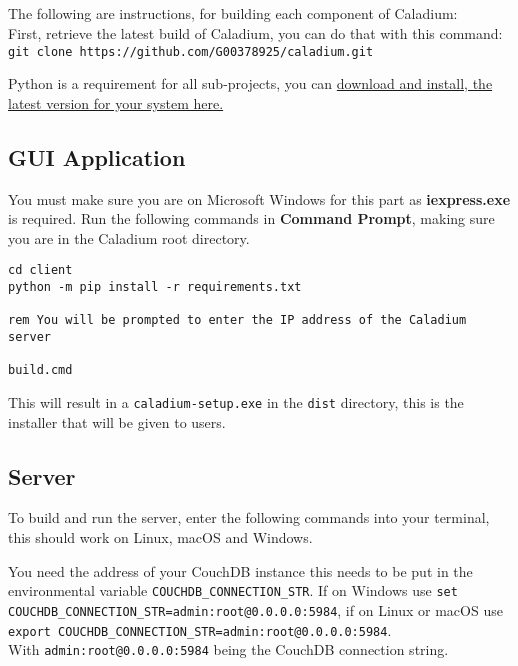 \begin{appendices}
\renewcommand{\chaptername}{Appendix C}
\renewcommand{\thechapter}{C}
\chapter{}
\label{appendix:c}

The following are instructions,
for building each component of Caladium: \\
First, retrieve the latest build of Caladium, you can do that with this command:
\texttt{git clone https://github.com/G00378925/caladium.git}

Python is a requirement for all sub-projects, you can
\href{https://www.python.org/downloads/}{download and install, the latest version for your system here.}

\section{GUI Application}
You must make sure you are on Microsoft Windows
for this part as \textbf{iexpress.exe} is required.
Run the following commands in \textbf{Command Prompt},
making sure you are in the Caladium root directory.

\begin{lstlisting}
cd client
python -m pip install -r requirements.txt

rem You will be prompted to enter the IP address of the Caladium server

build.cmd
\end{lstlisting}

This will result in a \texttt{caladium-setup.exe} in the \texttt{dist} directory,
this is the installer that will be given to users.
\section{Server}
To build and run the server, enter the following commands into your terminal,
this should work on Linux, macOS and Windows.

You need the address of your CouchDB instance this needs
to be put in the environmental variable \texttt{COUCHDB\_CONNECTION\_STR}.
If on Windows use
\texttt{set COUCHDB\_CONNECTION\_STR=admin:root@0.0.0.0:5984},
if on Linux or macOS use
\texttt{export COUCHDB\_CONNECTION\_STR=admin:root@0.0.0.0:5984}. \\
With \texttt{admin:root@0.0.0.0:5984} being the CouchDB connection string.


\end{appendices}
